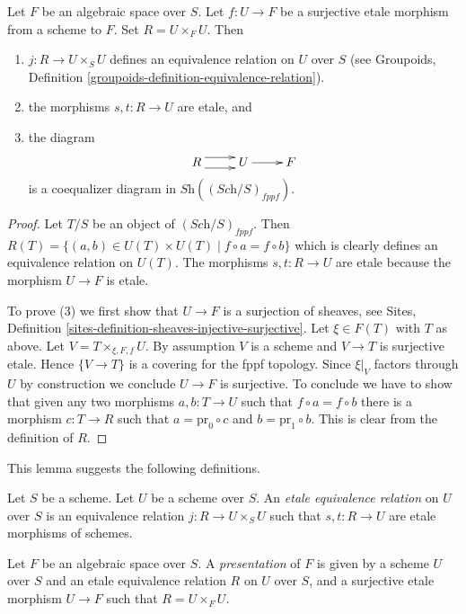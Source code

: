 \begin{lemma}
\label{lemma-space-presentation}
Let $F$ be an algebraic space over $S$. Let $f : U \to F$ be a
surjective etale morphism from a scheme to $F$. Set $R = U \times_F U$.
Then
\begin{enumerate}
\item $j : R \to U \times_S U$ defines an equivalence relation on
$U$ over $S$ (see
Groupoids, Definition \ref{groupoids-definition-equivalence-relation}).
\item the morphisms $s, t : R \to U$ are etale, and
\item the diagram
$$
\xymatrix{
R \ar@<1ex>[r] \ar@<-1ex>[r] &
U \ar[r] &
F
}
$$
is a coequalizer diagram in $\textit{Sh}((\textit{Sch}/S)_{fppf})$.
\end{enumerate}
\end{lemma}

\begin{proof}
Let $T/S$ be an object of $(\textit{Sch}/S)_{fppf}$.
Then $R(T) = \{(a, b) \in U(T) \times U(T) \mid f \circ a = f \circ b\}$
which is clearly defines an equivalence relation on $U(T)$.
The morphisms $s, t : R \to U$ are etale because the morphism
$U \to F$ is etale.

\medskip\noindent
To prove (3) we first show that
$U \to F$ is a surjection of sheaves, see
Sites, Definition \ref{sites-definition-sheaves-injective-surjective}.
Let $\xi \in F(T)$ with $T$ as above. Let $V = T \times_{\xi, F, f}U$.
By assumption $V$ is a scheme and $V \to T$ is surjective etale.
Hence $\{V \to T\}$ is a covering for the fppf topology.
Since $\xi|_V$ factors through $U$ by construction we
conclude $U \to F$ is surjective. To conclude we
have to show that given any two morphisms
$a, b : T \to U$ such that $f \circ a = f \circ b$ there is a
morphism $c : T \to R$ such that $a = \text{pr}_0 \circ c$
and $b = \text{pr}_1 \circ b$. This is clear from the definition
of $R$.
\end{proof}

\noindent
This lemma suggests the following definitions.

\begin{definition}
\label{definition-etale-equivalence-relation}
Let $S$ be a scheme. Let $U$ be a scheme over $S$.
An {\it etale equivalence relation} on $U$ over $S$
is an equivalence relation $j : R \to U \times_S U$
such that $s, t : R \to U$ are etale morphisms of schemes.
\end{definition}

\begin{definition}
\label{definition-presentation}
Let $F$ be an algebraic space over $S$.
A {\it presentation} of $F$ is given by a scheme
$U$ over $S$ and an etale equivalence relation $R$ on $U$ over $S$, and
a surjective etale morphism $U \to F$ such that $R = U \times_F U$.
\end{definition}


